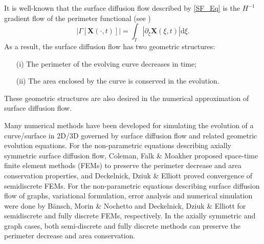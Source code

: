 \documentclass[review]{elsarticle}
\def\d{{\mathrm d}}
\begin{document}
It is well-known that the surface diffusion flow described by \eqref{SF_Eq} is the $H^{-1}$ gradient flow of the perimeter functional (see \cite{Cahn94,Taylor94})
$$
|\Gamma[\mathbf X(\cdot,t)]|
=\int_I |\partial_\xi \mathbf X(\xi,t)|\d \xi  .
$$
As a result, the surface diffusion flow has two geometric structures:
\begin{itemize}
\item[{(i)}]The perimeter of the evolving curve decreases in time;
\item[{(ii)}]The area enclosed by the curve is conserved in the evolution.
\end{itemize}
These geometric structures are also desired in the numerical approximation of surface diffusion flow.

Many numerical methods have been developed for simulating the evolution of a curve/surface in 2D/3D governed by surface diffusion flow and related geometric evolution equations. 
For the non-parametric equations describing axially symmetric surface diffusion flow, Coleman, Falk \& Moakher \cite{Coleman-Falk-Moakher-1996} proposed space-time finite element methods (FEMs) to preserve the perimeter decrease and area conservation properties, and Deckelnick, Dziuk \& Elliott \cite{Deckelnick-Dziuk-Elliott-2003} proved convergence of semidiscrete FEMs. 
For the non-parametric equations describing surface diffusion flow of graphs, variational formulation, error analysis and numerical simulation were done by B\"ansch, Morin \& Nochetto \cite{Bansch04} and 
Deckelnick, Dziuk \& Elliott \cite{Deckelnick-Dziuk-Elliott-2005-SINUM} for semidiscrete and fully discrete FEMs, respectively. 
In the axially symmetric and graph cases, both semi-discrete and fully discrete methods can preserve the perimeter decrease and area conservation. 
\end{document}
